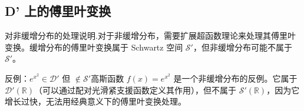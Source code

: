 \documentclass[12pt,a4paper]{article}
\theoremstyle{plain}
\theoremstyle{definition}
\theoremstyle{remark}
\begin{document}
\subsection{D' 上的傅里叶变换}

对非缓增分布的处理说明.对于非缓增分布，需要扩展超函数理论来处理其傅里叶变换。缓增分布的傅里叶变换属于 Schwartz 空间 \( \mathcal{S}' \)，但非缓增分布可能不属于 \( \mathcal{S}' \)。

反例：\( e^{x^2} \in \mathcal{D}' \) 但 \( \notin \mathcal{S}' \)高斯函数 \( f(x) = e^{x^2} \) 是一个非缓增分布的反例。它属于 \( \mathcal{D}'(\mathbb{R}) \)（可以通过配对光滑紧支援函数定义其作用），但不属于 \( \mathcal{S}'(\mathbb{R}) \)，因为它增长过快，无法用经典意义下的傅里叶变换处理。
\end{document}
